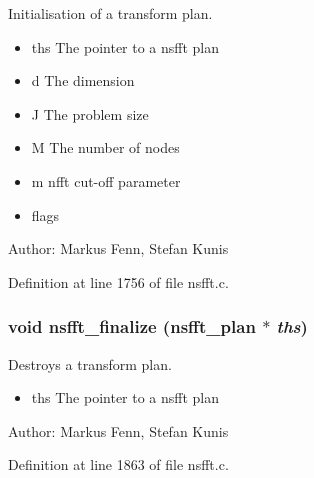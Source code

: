 Initialisation of a transform plan. 

\begin{itemize}
\item ths The pointer to a nsfft plan \item d The dimension \item J The problem size \item M The number of nodes \item m nfft cut-off parameter \item flags\end{itemize}
\begin{Desc}
\item[Author:]Markus Fenn, Stefan Kunis \end{Desc}


Definition at line 1756 of file nsfft.c.\hypertarget{group__nsfft_gef170ad12eff8fde1c78bc6071142b36}{
\subsubsection{\setlength{\rightskip}{0pt plus 5cm}void nsfft\_\-finalize ({\bf nsfft\_\-plan} $\ast$ {\em ths})}}
\label{group__nsfft_gef170ad12eff8fde1c78bc6071142b36}


Destroys a transform plan. 

\begin{itemize}
\item ths The pointer to a nsfft plan\end{itemize}
\begin{Desc}
\item[Author:]Markus Fenn, Stefan Kunis \end{Desc}


Definition at line 1863 of file nsfft.c.
